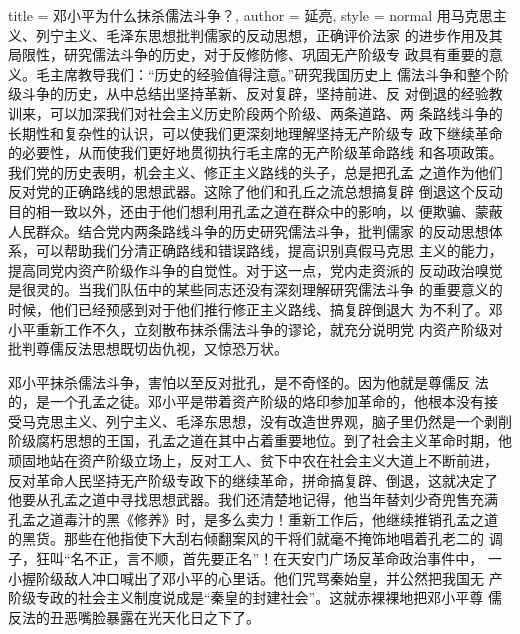 \begin{hongqiarticle}{
        title  = {邓小平为什么抹杀儒法斗争？},
        author = {延亮},
        style  = normal
    }
    用马克思主义、列宁主义、毛泽东思想批判儒家的反动思想，正确评价法家
    的进步作用及其局限性，研究儒法斗争的历史，对于反修防修、巩固无产阶级专
    政具有重要的意义。毛主席教导我们：“历史的经验值得注意。”研究我国历史上
    儒法斗争和整个阶级斗争的历史，从中总结出坚持革新、反对复辟，坚持前进、反
    对倒退的经验教训来，可以加深我们对社会主义历史阶段两个阶级、两条道路、两
    条路线斗争的长期性和复杂性的认识，可以使我们更深刻地理解坚持无产阶级专
    政下继续革命的必要性，从而使我们更好地贯彻执行毛主席的无产阶级革命路线
    和各项政策。我们党的历史表明，机会主义、修正主义路线的头子，总是把孔孟
    之道作为他们反对党的正确路线的思想武器。这除了他们和孔丘之流总想搞复辟
    倒退这个反动目的相一致以外，还由于他们想利用孔孟之道在群众中的影响，以
    便欺骗、蒙蔽人民群众。结合党内两条路线斗争的历史研究儒法斗争，批判儒家
    的反动思想体系，可以帮助我们分清正确路线和错误路线，提高识别真假马克思
    主义的能力，提高同党内资产阶级作斗争的自觉性。对于这一点，党内走资派的
    反动政治嗅觉是很灵的。当我们队伍中的某些同志还没有深刻理解研究儒法斗争
    的重要意义的时候，他们已经预感到对于他们推行修正主义路线、搞复辟倒退大
    为不利了。邓小平重新工作不久，立刻散布抹杀儒法斗争的谬论，就充分说明党
    内资产阶级对批判尊儒反法思想既切齿仇视，又惊恐万状。

    邓小平抹杀儒法斗争，害怕以至反对批孔，是不奇怪的。因为他就是尊儒反
    法的，是一个孔孟之徒。邓小平是带着资产阶级的烙印参加革命的，他根本没有接
    受马克思主义、列宁主义、毛泽东思想，没有改造世界观，脑子里仍然是一个剥削
    阶级腐朽思想的王国，孔孟之道在其中占着重要地位。到了社会主义革命时期，他
    顽固地站在资产阶级立场上，反对工人、贫下中农在社会主义大道上不断前进，
    反对革命人民坚持无产阶级专政下的继续革命，拼命搞复辟、倒退，这就决定了
    他要从孔孟之道中寻找思想武器。我们还清楚地记得，他当年替刘少奇兜售充满
    孔孟之道毒汁的黑《修养》时，是多么卖力！重新工作后，他继续推销孔孟之道
    的黑货。那些在他指使下大刮右倾翻案风的干将们就毫不掩饰地唱着孔老二的
    调子，狂叫“名不正，言不顺，首先要正名”！在天安门广场反革命政治事件中，
    一小握阶级敌人冲口喊出了邓小平的心里话。他们咒骂秦始皇，并公然把我国无
    产阶级专政的社会主义制度说成是“秦皇的封建社会”。这就赤裸裸地把邓小平尊
    儒反法的丑恶嘴脸暴露在光天化日之下了。


\end{hongqiarticle}
